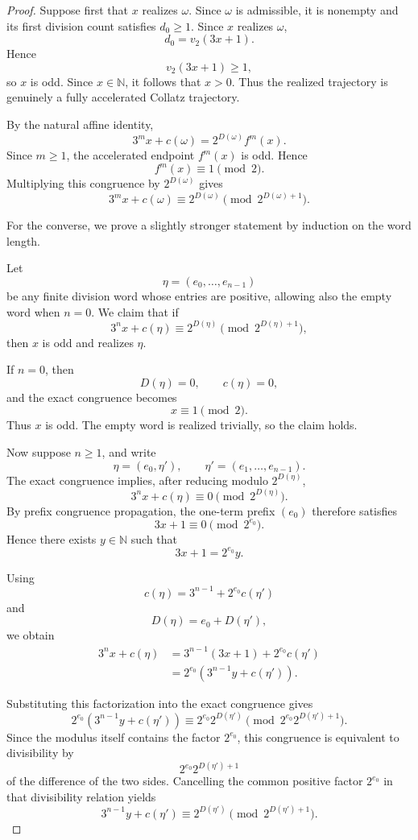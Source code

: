 \documentclass[12pt, oneside]{article}
\numberwithin{equation}{section}
\theoremstyle{definition}
\theoremstyle{plain}
\theoremstyle{remark}
\begin{document}
\begin{proof}
Suppose first that \(x\) realizes \(\omega\). Since \(\omega\) is
admissible, it is nonempty and its first division count satisfies
\(d_0\ge1\). Since \(x\) realizes \(\omega\),
\[
d_0=v_2(3x+1).
\]
Hence
\[
v_2(3x+1)\ge1,
\]
so \(x\) is odd. Since \(x\in\mathbb N\), it follows that \(x>0\).
Thus the realized trajectory is genuinely a fully accelerated Collatz
trajectory.

By the natural affine identity,
\[
3^m x+c(\omega)
=
2^{D(\omega)}f^m(x).
\]
Since \(m\ge1\), the accelerated endpoint \(f^m(x)\) is odd. Hence
\[
f^m(x)\equiv1\pmod2.
\]
Multiplying this congruence by \(2^{D(\omega)}\) gives
\[
3^m x+c(\omega)
\equiv
2^{D(\omega)}
\pmod{2^{D(\omega)+1}}.
\]

For the converse, we prove a slightly stronger statement by induction on
the word length.

Let
\[
\eta=(e_0,\dots,e_{n-1})
\]
be any finite division word whose entries are positive, allowing also the
empty word when \(n=0\). We claim that if
\[
3^n x+c(\eta)
\equiv
2^{D(\eta)}
\pmod{2^{D(\eta)+1}},
\]
then \(x\) is odd and realizes \(\eta\).

If \(n=0\), then
\[
D(\eta)=0,
\qquad
c(\eta)=0,
\]
and the exact congruence becomes
\[
x\equiv1\pmod2.
\]
Thus \(x\) is odd. The empty word is realized trivially, so the claim
holds.

Now suppose \(n\ge1\), and write
\[
\eta=(e_0,\eta'),
\qquad
\eta'=(e_1,\dots,e_{n-1}).
\]
The exact congruence implies, after reducing modulo \(2^{D(\eta)}\),
\[
3^n x+c(\eta)
\equiv
0
\pmod{2^{D(\eta)}}.
\]
By prefix congruence propagation, the one-term prefix \((e_0)\) therefore
satisfies
\[
3x+1
\equiv
0
\pmod{2^{e_0}}.
\]
Hence there exists \(y\in\mathbb N\) such that
\[
3x+1=2^{e_0}y.
\]

Using
\[
c(\eta)
=
3^{n-1}
+
2^{e_0}c(\eta')
\]
and
\[
D(\eta)
=
e_0+D(\eta'),
\]
we obtain
\[
\begin{aligned}
3^n x+c(\eta)
&=
3^{n-1}(3x+1)
+
2^{e_0}c(\eta')\\
&=
2^{e_0}
\left(
3^{n-1}y+c(\eta')
\right).
\end{aligned}
\]

Substituting this factorization into the exact congruence gives
\[
2^{e_0}
\left(
3^{n-1}y+c(\eta')
\right)
\equiv
2^{e_0}2^{D(\eta')}
\pmod{
2^{e_0}2^{D(\eta')+1}
}.
\]
Since the modulus itself contains the factor \(2^{e_0}\), this congruence
is equivalent to divisibility by
\[
2^{e_0}2^{D(\eta')+1}
\]
of the difference of the two sides. Cancelling the common positive factor
\(2^{e_0}\) in that divisibility relation yields
\[
3^{n-1}y+c(\eta')
\equiv
2^{D(\eta')}
\pmod{2^{D(\eta')+1}}.
\]


\end{proof}
\end{document}
